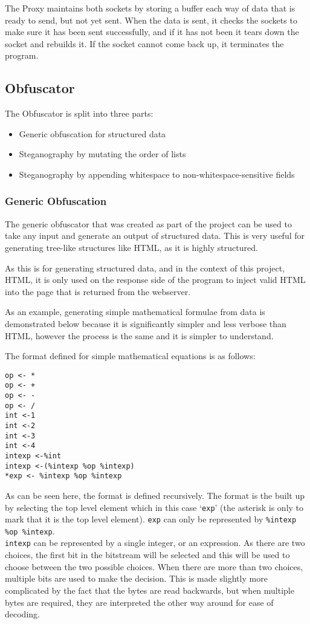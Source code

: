 The Proxy maintains both sockets by storing a buffer each way of data that is ready to send, but not yet sent. When the data is sent, it checks the sockets to make sure it has been sent successfully, and if it has not been it tears down the socket and rebuilds it. If the socket cannot come back up, it terminates the program.
\subsection{Obfuscator}
The Obfuscator is split into three parts:
\begin{itemize}
    \item Generic obfuscation for structured data
    \item Steganography by mutating the order of lists
    \item Steganography by appending whitespace to non-whitespace-sensitive fields
\end{itemize}

\subsubsection{Generic Obfuscation}
The generic obfuscator that was created as part of the project can be used to take any input and generate an output of structured data. This is very useful for generating tree-like structures like HTML, as it is highly structured.\par
As this is for generating structured data, and in the context of this project, HTML, it is only used on the response side of the program to inject valid HTML into the page that is returned from the webserver.\par
As an example, generating simple mathematical formulae from data is demonstrated below because it is significantly simpler and less verbose than HTML, however the process is the same and it is simpler to understand.\par
The format defined for simple mathematical equations is as follows:
\begin{lstlisting}[language=pagefile]
op <- *
op <- +
op <- -
op <- /
int <-1
int <-2
int <-3
int <-4
intexp <-%int
intexp <-(%intexp %op %intexp)
*exp <- %intexp %op %intexp
\end{lstlisting}

As can be seen here, the format is defined recursively.
The format is the built up by selecting the top level element which in this case `\texttt{exp}' (the asterisk is only to mark that it is the top level element).
\texttt{exp} can only be represented by \texttt{\%intexp \%op \%intexp}. \\
\texttt{intexp} can be represented by a single integer, or an expression.
As there are two choices, the first bit in the bitstream will be selected and this will be used to choose between the two possible choices.
When there are more than two choices, multiple bits are used to make the decision.
This is made slightly more complicated by the fact that the bytes are read backwards, but when multiple bytes are required, they are interpreted the other way around for ease of decoding.

